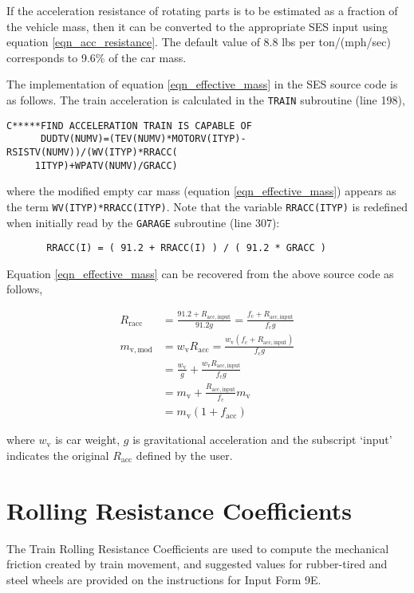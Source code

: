 \documentclass[11pt]{article} %
\begin{document}
If the acceleration resistance of rotating parts is to be estimated as a fraction of the vehicle mass, then it can be converted to the appropriate SES input using equation \ref{eqn_acc_resistance}.
The default value of 8.8 lbs per ton/(mph/sec) corresponds to 9.6\% of the car mass. 

The implementation of equation \ref{eqn_effective_mass} in the SES source code is as follows.
The train acceleration is calculated in the {\tt TRAIN} subroutine (line 198), 

\begin{lstlisting}
C*****FIND ACCELERATION TRAIN IS CAPABLE OF                             
      DUDTV(NUMV)=(TEV(NUMV)*MOTORV(ITYP)-RSISTV(NUMV))/(WV(ITYP)*RRACC(
     1ITYP)+WPATV(NUMV)/GRACC) 
\end{lstlisting}

\noindent where the modified empty car mass (equation \ref{eqn_effective_mass}) appears as the term {\tt WV(ITYP)*RRACC(ITYP)}.
Note that the variable {\tt RRACC(ITYP)} is redefined when initially read by the {\tt GARAGE} subroutine (line 307):

\begin{lstlisting}
       RRACC(I) = ( 91.2 + RRACC(I) ) / ( 91.2 * GRACC )               
\end{lstlisting}

Equation \ref{eqn_effective_mass} can be recovered from the above source code as follows,

\begin{align*}
R_\mathrm{racc} &= \frac{91.2 + R_\mathrm{acc,input}}{91.2 g} = \frac{f_\mathrm{c} + R_\mathrm{acc,input}}{f_\mathrm{c} g} \\
m_{\mathrm{v,mod}} &= w_\mathrm{v} R_\mathrm{acc} = \frac{w_\mathrm{v} ( f_\mathrm{c} + R_\mathrm{acc,input} ) }{f_\mathrm{c} g} \\
 &= \frac{w_\mathrm{v}}{g} +  \frac{ w_\mathrm{v} R_\mathrm{acc,input}  }{f_\mathrm{c} g} \\
 &= m_\mathrm{v} +  \frac{ R_\mathrm{acc,input}  }{f_\mathrm{c}} m_\mathrm{v} \\
 &= m_\mathrm{v} \left(1 + f_\mathrm{acc}\right)
\end{align*}

\noindent where $w_\mathrm{v}$ is car weight, $g$ is gravitational acceleration and the subscript `input' indicates the original $R_\mathrm{acc}$ defined by the user.

\section{Rolling Resistance Coefficients}
The Train Rolling Resistance Coefficients are used to compute the mechanical friction created by
train movement, and suggested values for rubber-tired and steel wheels are provided on the instructions
for Input Form 9E. 
\end{document}
